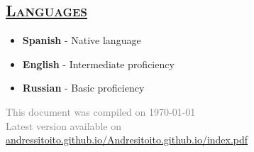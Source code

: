 \documentclass{resume} %
\begin{document}
\begin{multicols}{2}
    \vspace{-15px}
    \section*{\textsc{\underline{Languages}}}
    \begin{itemize}
      \setlength\itemsep{-15px}
        \item \textbf{Spanish} - \textcolor{light-gray}{Native language}
        \item \textbf{English} - \textcolor{light-gray}{Intermediate proficiency}
        \item \textbf{Russian} - \textcolor{light-gray}{Basic proficiency}
      \end{itemize}

    {\bf } 


\end{multicols}









\begin{flushright}
\end{flushright} 
\textcolor{gray}{This document was compiled on \today\\ Latest version available on \href{https://andressitoito.github.io/Andresitoito.github.io/index.pdf}{andressitoito.github.io/Andresitoito.github.io/index.pdf}}
\end{document}
